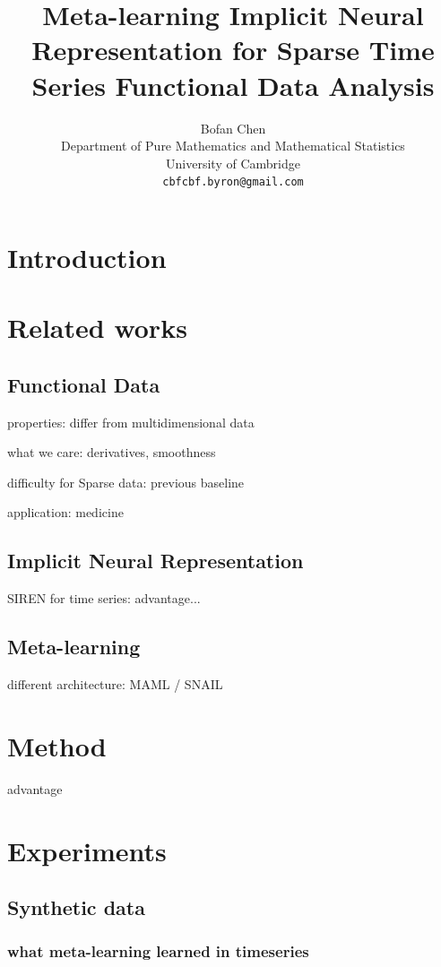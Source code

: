 \documentclass{article}
\title{Meta-learning Implicit Neural Representation for Sparse Time Series Functional Data Analysis}
\author{%
  Bofan Chen\\
  Department of Pure Mathematics and Mathematical Statistics\\
  University of Cambridge\\
  \texttt{cbfcbf.byron@gmail.com} \\}
\begin{document}
\maketitle

\section{Introduction}

\section{Related works}

\subsection{Functional Data}
properties: differ from multidimensional data

what we care: derivatives, smoothness

difficulty for Sparse data: previous baseline

application: medicine

\subsection{Implicit Neural Representation}
SIREN for time series: advantage...

\subsection{Meta-learning}
different architecture: MAML / SNAIL

\section{Method}
advantage
\section{Experiments}

\subsection{Synthetic data}

\subsubsection{what meta-learning learned in  timeseries}
\end{document}
